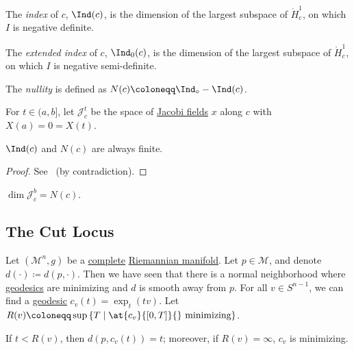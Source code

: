 \begin{definition}[Index]\label{def:index}
	The \emph{index} of \(c\), \(\Ind(c)\), is the dimension of the largest subspace of \(\mathring{H}_c^1\), on which \(I\) is negative definite.
\end{definition}

\begin{definition}\label{def:exteded-index}
	The \emph{extended index} of \(c\), \(\Ind_0(c)\), is the dimension of the largest subspace of \(\mathring{H}_c^1\), on which \(I\) is negative semi-definite.
\end{definition}

\begin{definition}[Nullity]\label{def:nullity}
	The \emph{nullity} is defined as  \(N(c) \coloneqq \Ind_{\circ} - \Ind(c)\).
\end{definition}

\begin{notation}
	For \(t\in (a, b]\), let \(\mathcal{J} ^t_c\) be the space of \hyperref[def:Jacobi-field]{Jacobi fields} \(x\) along \(c\) with \(X(a)= 0 = X(t)\).
\end{notation}

\begin{lemma}\label{lma:finite-index-nullity}
	\(\Ind(c)\) and \(N(c)\) are always finite.
\end{lemma}
\begin{proof}
	See~\cite{flaherty2013riemannian} (by contradiction).
\end{proof}

\begin{lemma}
	\(\dim \mathcal{J} _c^b = N(c)\).
\end{lemma}

\subsection{The Cut Locus}
Let \((\mathcal{M}^n , g)\) be a \hyperref[def:geodesically-complete]{complete} \hyperref[def:Riemannian-manifold]{Riemannian manifold}. Let \(p\in \mathcal{M} \), and denote \(d(\cdot) \coloneqq d(p, \cdot)\). Then we have seen that there is a normal neighborhood where \hyperref[def:geodesic]{geodesics} are minimizing and \(d\) is smooth away from \(p\). For all \(v\in S^{n-1}\), we can find a \hyperref[def:geodesic]{geodesic} \(c_v(t) = \exp _t(t v)\). Let \(R(v) \coloneqq \sup \left\{ T \mid \at{c_v}{[0, T]}{} \text{ minimizing}  \right\} \).

\begin{note}
	If \(t < R(v)\), then \(d(p, c_v(t)) = t\); moreover, if \(R(v) = \infty \), \(c_v\) is minimizing.
\end{note}

